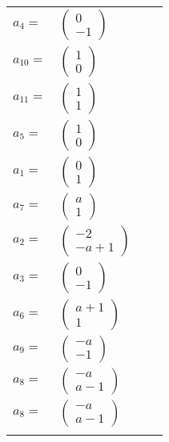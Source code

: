 \documentclass[1p]{elsarticle_modified}
\theoremstyle{definition}
\begin{document}
\begin{tabular}{m{7pt} m{180pt} m{7pt} m{180pt} }
\flushright $a_{4}=$&$\begin{pmatrix}0\\-1\end{pmatrix}$ \\
\flushright $a_{10}=$&$\begin{pmatrix}1\\0\end{pmatrix}$ \\
\flushright $a_{11}=$&$\begin{pmatrix}1\\1\end{pmatrix}$ \\
\flushright $a_{5}=$&$\begin{pmatrix}1\\0\end{pmatrix}$ \\
\flushright $a_{1}=$&$\begin{pmatrix}0\\1\end{pmatrix}$ \\
\flushright $a_{7}=$&$\begin{pmatrix}a\\1\end{pmatrix}$ \\
\flushright $a_{2}=$&$\begin{pmatrix}-2\\- a+1\end{pmatrix}$ \\
\flushright $a_{3}=$&$\begin{pmatrix}0\\-1\end{pmatrix}$ \\
\flushright $a_{6}=$&$\begin{pmatrix}a+1\\1\end{pmatrix}$ \\
\flushright $a_{9}=$&$\begin{pmatrix}- a\\-1\end{pmatrix}$ \\
\flushright $a_{8}=$&$\begin{pmatrix}- a\\a-1\end{pmatrix}$\\ \flushright $a_{8}=$&$\begin{pmatrix}- a\\a-1\end{pmatrix}$\\&\end{tabular}
\end{document}
